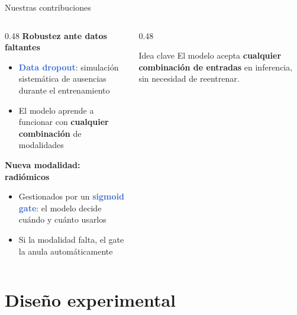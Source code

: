 \documentclass[aspectratio=169]{beamer}
\newcommand{\hl}[1]{\textcolor{highlight}{\textbf{#1}}}
\begin{document}
\begin{frame}{Nuestras contribuciones}
  \begin{columns}[T]
    \begin{column}{0.48\textwidth}
      \textbf{Robustez ante datos faltantes}
      \begin{itemize}
        \item \hl{Data dropout}: simulación sistemática de ausencias durante el entrenamiento
        \item El modelo aprende a funcionar con \textbf{cualquier combinación} de modalidades
      \end{itemize}

      \medskip
      \textbf{Nueva modalidad: radiómicos}
      \begin{itemize}
        \item Gestionados por un \hl{sigmoid gate}: el modelo decide cuándo y cuánto usarlos
        \item Si la modalidad falta, el gate la anula automáticamente
      \end{itemize}
    \end{column}
    \begin{column}{0.48\textwidth}

      \medskip
      \begin{exampleblock}{Idea clave}
        \small El modelo acepta \textbf{cualquier combinación de entradas} en inferencia, sin necesidad de reentrenar.
      \end{exampleblock}
    \end{column}
  \end{columns}
\end{frame}


\section{Diseño experimental}
\end{document}
